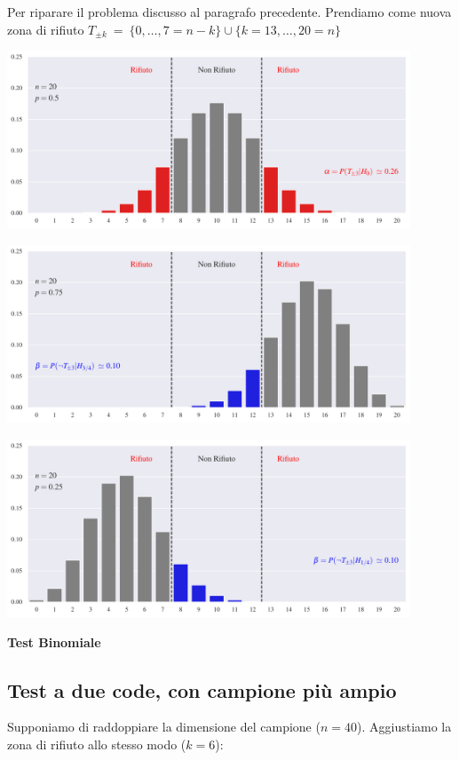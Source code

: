 \documentclass[11pt,openany]{book}
\begin{document}
Per riparare il problema discusso al paragrafo precedente. 
Prendiamo come nuova zona di rifiuto {\color{red}\boldmath $T_{\pm k}\ = \ \{0,\dots,7=n-k\}\cup \{k=13,\dots,20=n\}$}

\hfil\includegraphics[width=0.9\textwidth]{figure/B-test_04.pdf}

\hfil\includegraphics[width=0.9\textwidth]{figure/B-test_05.pdf}

\hfil\includegraphics[width=0.9\textwidth]{figure/B-test_06.pdf}




\clearpage\hfill\textbf{Test Binomiale}
\subsection{Test a due code, con campione più ampio}

Supponiamo di raddoppiare la dimensione del campione ($n=40$). Aggiustiamo la zona di rifiuto allo stesso modo ($k=6$): 
\end{document}
